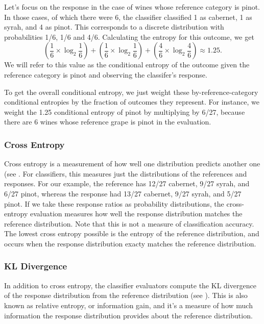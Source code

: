 Let's focus on the response in the case of wines whose reference
category is pinot.  In those cases, of which there were 6, the
classifier classified 1 as cabernet, 1 as syrah, and 4 as pinot.  
This corresponds to a discrete distribution with probabilities
1/6, 1/6 and 4/6.  Calculating the entropy for this outcome, we
get
%
\begin{equation}
\left( \frac{1}{6} \times \log_2 \frac{1}{6} \right)
+ \left( \frac{1}{6} \times \log_2 \frac{1}{6} \right)
+ \left( \frac{4}{6} \times \log_2 \frac{4}{6} \right)
\approx 1.25.
\end{equation}
%
We will refer to this value as the conditional entropy of the outcome
given the reference category is pinot and observing the classifer's
response.

To get the overall conditional entropy, we just weight these
by-reference-category conditional entropies by the fraction of
outcomes they represent.  For instance, we weight the 1.25 conditional
entropy of pinot by multiplying by 6/27, because there are 6 wines
whose reference grape is pinot in the evaluation.

\subsubsection{Cross Entropy}

Cross entropy is a measurement of how well one distribution predicts
another one (see .  For classifiers, this
measures just the distributions of the references and responses.  For
our example, the reference has 12/27 cabernet, 9/27 syrah, and 6/27
pinot, whereas the response had 13/27 cabernet, 9/27 syrah, and 5/27
pinot.  If we take these response ratios as probability distributions,
the cross-entropy evaluation measures how well the response
distribution matches the reference distribution.  Note that this is
not a measure of classification accuracy.  The lowest cross entropy
possible is the entropy of the reference distribution, and occurs when
the response distribution exacty matches the reference distribution.

\subsubsection{KL Divergence}

In addition to cross entropy, the classifier evaluators compute the KL
divergence of the response distribution from the reference
distribution (see ).  This is also known as
relative entropy, or information gain, and it's a measure of how much
information the response distribution provides about the reference
distribution.


